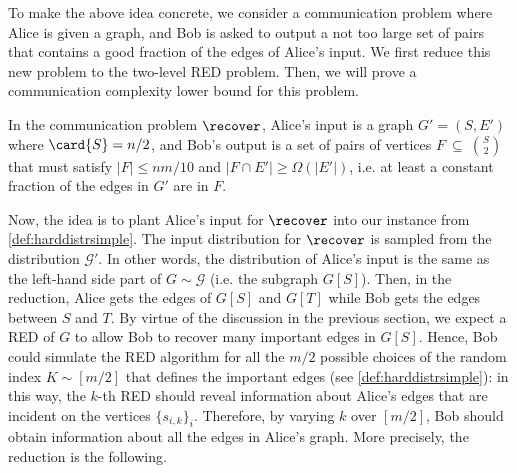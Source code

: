 To make the above idea concrete, we consider a communication problem where Alice is given a graph, and Bob is asked to output a not too large set of pairs that contains a good fraction of the edges of Alice's input. We first reduce this new problem to the two-level RED problem. Then, we will prove a communication complexity lower bound for this problem.
\begin{definition}
	\label{def:recoversimple}
    In the communication problem $\recover$, Alice's input is a graph $G'=(S,E')$ where $\card{S}=n/2$, and Bob's output is a set of pairs of vertices $F~\subseteq~\binom{S}{2}$ that must satisfy $|F| \le nm/10$ and $|F \cap E'| \ge \Omega(|E'|)$, i.e. at least a constant fraction of the edges in $G'$ are in $F$.
\end{definition}

\noindent
Now, the idea is to plant Alice's input for $\recover$ into our instance from \cref{def:harddistrsimple}. The input distribution for $\recover$ is sampled from  the distribution $\mathcal{G}'$. In other words, the distribution of Alice's input is the same as the left-hand side part of $G \sim \mathcal{G}$ (i.e. the subgraph $G[S]$). Then, in the reduction, Alice gets the edges of $G[S]$ and $G[T]$ while Bob gets the edges between $S$ and $T$. By virtue of the discussion in the previous section, we expect a RED of $G$ to allow Bob to recover many important edges in $G[S]$. Hence, Bob could simulate the RED algorithm for all the $m/2$ possible choices of the random index $K \sim [m/2]$ that defines the important edges (see \cref{def:harddistrsimple}): in this way, the $k$-th RED should reveal information about Alice's edges that are incident on the vertices $\{s_{i,k}\}_i$. Therefore, by varying $k$ over $[m/2]$, Bob should obtain information about all the edges in Alice's graph. More precisely, the reduction is the following.

